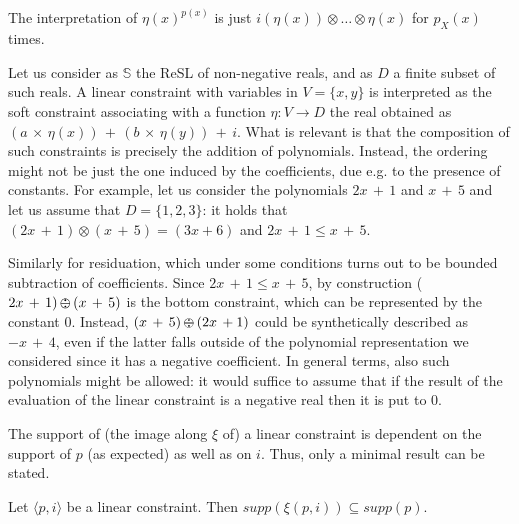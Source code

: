 \documentclass{llncs}
\def\monid{{\mathbf 0}}
\def\monop{\otimes}
\def\odiv{\, {\ominus\hspace{-7.7pt} \div} \,}
\def\monid{\mathbf{1}}
\begin{document}
The interpretation of $\eta(x)^{p(x)}$ is just $i(\eta(x)) \otimes \ldots \otimes \eta(x)$ for ${p_X(x)}$ times.

\begin{example}\label{execlim}
	Let us consider as $\mathbb S$ the ReSL of non-negative reals, 
	and as $D$ a finite subset of such reals.
	A linear constraint with variables in $V = \{x,y\}$ 
	is interpreted as the soft constraint associating 
	with a function $\eta: V \rightarrow D$ the real 
	obtained as $(a \, \times \, \eta(x)) \, + \, (b \, \times \, \eta(y)) \, + \, i$.
	What is relevant is that the composition of such constraints is precisely 
	the addition of polynomials.
	Instead, the ordering might not be just the one induced 
	by the coefficients, due e.g. to the presence of constants.
	For example, let us consider the polynomials $2x \, + \, 1$ and $x \, + \, 5$
	and let us assume that $D = \{1, 2, 3\}$: it holds that
	$(2x \, + \, 1)\monop (x \, + \, 5) = (3x + 6)$ and  
	$2x \, + \, 1 \leq x \, + \, 5$.
	
	Similarly for residuation, which under some conditions turns out to be bounded subtraction of coefficients.
	Since $2x \, + \, 1 \leq x \, + \, 5$,
	by construction ($2x \, + \, 1) \odiv (x \, + \, 5)$ is the bottom constraint,
	which can be represented by the constant $0$.
	Instead, $(x \, + \, 5) \odiv (2x \, + 1)$ could be synthetically
	described as $-x \, + \, 4$, even if
	the latter falls outside of the polynomial representation we considered since it has a negative coefficient.
	In general terms, also such polynomials might be allowed: 
	it would suffice to assume that if the result of the evaluation of the linear constraint 
	is a negative real then it is put to $0$.
\end{example}

The support of (the image along $\xi$ of) a linear constraint is dependent on the support of $p$ (as expected)
as well as on $i$.
%
%
Thus, only a minimal result can be stated.

\begin{lemma}[Support]
Let $\langle p, i \rangle$ be a linear constraint. Then $supp(\xi(p,i)) \subseteq supp(p)$.
\end{lemma}
\end{document}
